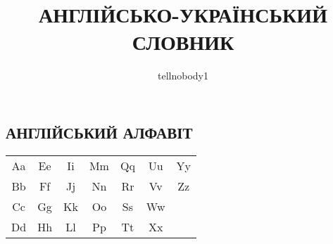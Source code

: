 


\title{\uppercase{Англійсько-український\\словник}}
\author{tellnobody1}
\maketitle

\thispagestyle{empty}
\clearpage

\begin{center}
\section{\uppercase{Англійський алфавіт}}
\begin{tabular}{| c c c c c c c |}
  \hline
  Aa & Ee & Ii & Mm & Qq & Uu & Yy \\
  Bb & Ff & Jj & Nn & Rr & Vv & Zz \\
  Cc & Gg & Kk & Oo & Ss & Ww &    \\
  Dd & Hh & Ll & Pp & Tt & Xx &    \\
  \hline
\end{tabular}
\end{center}

\thispagestyle{empty}
\clearpage


